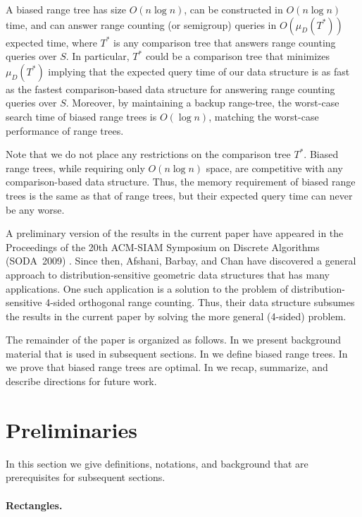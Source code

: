 \documentclass{patmorin}
\begin{document}
A biased range tree has size $O(n\log n)$, can be constructed in
$O(n\log n)$ time, and can answer range counting (or semigroup) queries
in $O(\mu_D(T^*))$ expected time, where $T^*$ is any comparison tree
that answers range counting queries over $S$.  In particular, $T^*$
could be a comparison tree that minimizes $\mu_D(T^*)$ implying that
the expected query time of our data structure is as fast as the fastest
comparison-based data structure for answering range counting queries
over $S$.  Moreover, by maintaining a backup range-tree, the worst-case
search time of biased range trees is $O(\log n)$, matching the worst-case
performance of range trees.

Note that we do not place any restrictions on the comparison tree $T^*$.
Biased range trees, while requiring only $O(n\log n)$ space, are
competitive with any comparison-based data structure.  Thus, the memory
requirement of biased range trees is the same as that of range trees, but
their expected query time can never be any worse.

A preliminary version of the results in the current paper have
appeared in the Proceedings of the 20th ACM-SIAM Symposium on Discrete
Algorithms (SODA~2009) \cite{dhm09}.  Since then, Afshani, Barbay, and Chan
\cite{abc09} have discovered a general approach to distribution-sensitive
geometric data structures that has many applications.  One such
application is a solution to the problem of distribution-sensitive
4-sided orthogonal range counting.  Thus, their data structure subsumes
the results in the current paper by solving the more general (4-sided)
problem.

The remainder of the paper is organized as follows. In
 we present background material that is used in
subsequent sections.  In  we define biased
range trees. In  we prove that biased range trees
are optimal.  In  we recap, summarize, and describe
directions for future work.

\section{Preliminaries}


In this section we give definitions, notations, and background
that are prerequisites for subsequent sections.

\paragraph{Rectangles.}
\end{document}
